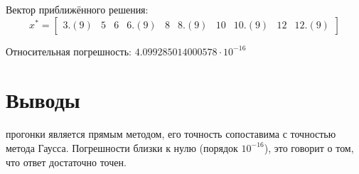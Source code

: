 \documentclass[12pt]{report}
\begin{document}
Вектор приближённого решения:
\[x^* = 
\begin{bmatrix}
     3.(9) & 5 & 6 & 6.(9) & 8 & 8.(9) & 10 & 10.(9) & 12 & 12.(9)
\end{bmatrix}
\]

Относительная погрешность: $4.099285014000578 \cdot 10^{-16}$

\section{Выводы}

 прогонки является прямым методом, его точность  сопоставима с точностью метода Гаусса. Погрешности близки к нулю (порядок $10^{-16}$), это говорит о том, что ответ достаточно точен.
\end{document}

